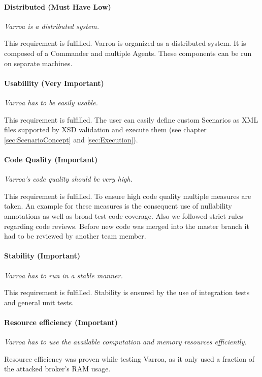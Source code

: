 \paragraph{Distributed (Must Have Low)} 
\emph{Varroa is a distributed system.}

This requirement is fulfilled.
Varroa is organized as a distributed system.
It is composed of a Commander and multiple Agents.
These components can be run on separate machines. 
 
\paragraph{Usabillity (Very Important)} 
\emph{Varroa has to be easily usable.}

This requirement is fulfilled.
The user can easily define custom Scenarios as XML files supported by XSD validation and execute them (see chapter \ref{sec:ScenarioConcept} and \ref{sec:Execution}).

\paragraph{Code Quality (Important)} 
\emph{Varroa's code quality should be very high.}

This requirement is fulfilled.
To ensure high code quality multiple measures are taken.
An example for these measures is the consequent use of nullability annotations as well as broad test code coverage. 
Also we followed strict rules regarding code reviews.
Before new code was merged into the master branch it had to be reviewed by another team member.

\paragraph{Stability (Important)} 
\emph{Varroa has to run in a stable manner.}

This requirement is fulfilled.
Stability is ensured by the use of integration tests and general unit tests.

\paragraph{Resource efficiency (Important)} 
\emph{Varroa has to use the available computation and memory resources efficiently.}

Resource efficiency was proven while testing Varroa, as it only used a fraction of the attacked broker's RAM usage.

